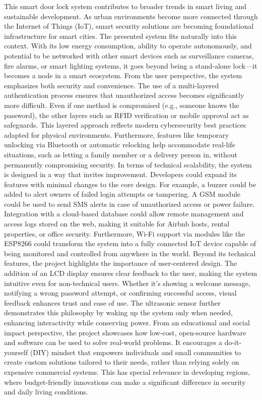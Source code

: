 \documentclass[conference, onecolumn]{IEEEtran}
\begin{document}
This smart door lock system contributes to broader trends in smart living and sustainable development. As urban environments become more connected through the Internet of Things (IoT), smart security solutions are becoming foundational infrastructure for smart cities. The presented system fits naturally into this context. With its low energy consumption, ability to operate autonomously, and potential to be networked with other smart devices such as surveillance cameras, fire alarms, or smart lighting systems, it goes beyond being a stand-alone lock—it becomes a node in a smart ecosystem.
From the user perspective, the system emphasizes both security and convenience. The use of a multi-layered authentication process ensures that unauthorized access becomes significantly more difficult. Even if one method is compromised (e.g., someone knows the password), the other layers such as RFID verification or mobile approval act as safeguards. This layered approach reflects modern cybersecurity best practices adapted for physical environments. Furthermore, features like temporary unlocking via Bluetooth or automatic relocking help accommodate real-life situations, such as letting a family member or a delivery person in, without permanently compromising security.
In terms of technical scalability, the system is designed in a way that invites improvement. Developers could expand its features with minimal changes to the core design. For example, a buzzer could be added to alert owners of failed login attempts or tampering. A GSM module could be used to send SMS alerts in case of unauthorized access or power failure. Integration with a cloud-based database could allow remote management and access logs stored on the web, making it suitable for Airbnb hosts, rental properties, or office security. Furthermore, Wi-Fi support via modules like the ESP8266 could transform the system into a fully connected IoT device capable of being monitored and controlled from anywhere in the world.
Beyond its technical features, the project highlights the importance of user-centered design. The addition of an LCD display ensures clear feedback to the user, making the system intuitive even for non-technical users. Whether it's showing a welcome message, notifying a wrong password attempt, or confirming successful access, visual feedback enhances trust and ease of use. The ultrasonic sensor further demonstrates this philosophy by waking up the system only when needed, enhancing interactivity while conserving power.
From an educational and social impact perspective, the project showcases how low-cost, open-source hardware and software can be used to solve real-world problems. It encourages a do-it-yourself (DIY) mindset that empowers individuals and small communities to create custom solutions tailored to their needs, rather than relying solely on expensive commercial systems. This has special relevance in developing regions, where budget-friendly innovations can make a significant difference in security and daily living conditions.
\end{document}
